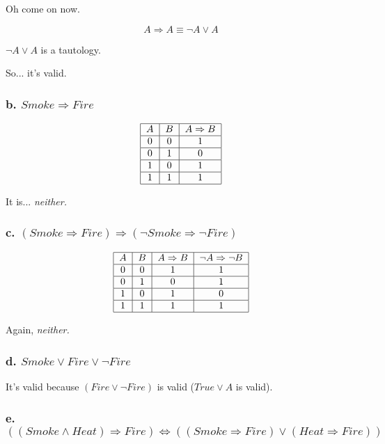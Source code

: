 \documentclass{article}
\begin{document}
Oh come on now.

\begin{equation}
A\Rightarrow A\equiv \lnot A\vee A  \tag{implication elimination}
\end{equation}

$\lnot A\vee A$ is a tautology.

So... it's valid.

\subsubsection{b. $Smoke\Rightarrow Fire$}

\[
\begin{tabular}{|c|c|c|}
\hline
$A$ & $B$ & $A\Rightarrow B$ \\ \hline
0 & 0 & 1 \\ \hline
0 & 1 & 0 \\ \hline
1 & 0 & 1 \\ \hline
1 & 1 & 1 \\ \hline
\end{tabular}%
\]

It is... \textit{neither.}

\subsubsection{c. $\left( Smoke\Rightarrow Fire\right) \Rightarrow \left(
\lnot Smoke\Rightarrow \lnot Fire\right) $}

\[
\begin{tabular}{|c|c|c|c|}
\hline
$A$ & $B$ & $A\Rightarrow B$ & $\lnot A\Rightarrow \lnot B$ \\ \hline
0 & 0 & 1 & 1 \\ \hline
0 & 1 & 0 & 1 \\ \hline
1 & 0 & 1 & 0 \\ \hline
1 & 1 & 1 & 1 \\ \hline
\end{tabular}%
\]

Again, \textit{neither.}

\subsubsection{d. $Smoke\vee Fire\vee \lnot Fire$}

It's valid because $\left( Fire\vee \lnot Fire\right) $ is valid ($True\vee A
$ is valid).

\subsubsection{e. $\left( \left( Smoke\wedge Heat\right) \Rightarrow
Fire\right) \Leftrightarrow \left( \left( Smoke\Rightarrow Fire\right) \vee
\left( Heat\Rightarrow Fire\right) \right) $}
\end{document}
